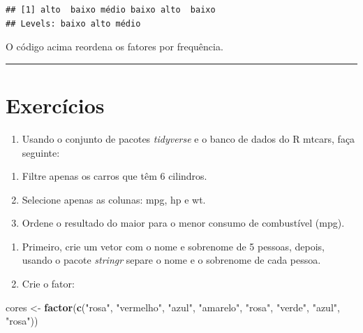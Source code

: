 \documentclass[
]{book}
\newenvironment{Shaded}{\begin{snugshade}}{\end{snugshade}}
\newcommand{\FunctionTok}[1]{\textcolor[rgb]{0.13,0.29,0.53}{\textbf{#1}}}
\newcommand{\NormalTok}[1]{#1}
\newcommand{\OtherTok}[1]{\textcolor[rgb]{0.56,0.35,0.01}{#1}}
\newcommand{\StringTok}[1]{\textcolor[rgb]{0.31,0.60,0.02}{#1}}
\providecommand{\tightlist}{%
  \setlength{\itemsep}{0pt}\setlength{\parskip}{0pt}}
\begin{document}
\begin{verbatim}
## [1] alto  baixo médio baixo alto  baixo
## Levels: baixo alto médio
\end{verbatim}

O código acima reordena os fatores por frequência.

\begin{center}\rule{0.5\linewidth}{0.5pt}\end{center}

\section{Exercícios}\label{exercuxedcios-1}

\begin{enumerate}
\def\labelenumi{\arabic{enumi}.}
\tightlist
\item
  Usando o conjunto de pacotes \emph{tidyverse} e o banco de dados do R mtcars, faça seguinte:
\end{enumerate}

\begin{enumerate}
\def\labelenumi{(\alph{enumi})}
\tightlist
\item
  Filtre apenas os carros que têm 6 cilindros.
\item
  Selecione apenas as colunas: mpg, hp e wt.
\item
  Ordene o resultado do maior para o menor consumo de combustível (mpg).
\end{enumerate}

\begin{enumerate}
\def\labelenumi{\arabic{enumi}.}
\setcounter{enumi}{1}
\item
  Primeiro, crie um vetor com o nome e sobrenome de 5 pessoas, depois, usando o pacote \emph{stringr} separe o nome e o sobrenome de cada pessoa.
\item
  Crie o fator:
\end{enumerate}

\begin{Shaded}
\begin{Highlighting}[]
\NormalTok{cores }\OtherTok{\textless{}{-}} \FunctionTok{factor}\NormalTok{(}\FunctionTok{c}\NormalTok{(}\StringTok{"rosa"}\NormalTok{, }\StringTok{"vermelho"}\NormalTok{, }\StringTok{"azul"}\NormalTok{, }\StringTok{"amarelo"}\NormalTok{, }\StringTok{"rosa"}\NormalTok{, }\StringTok{"verde"}\NormalTok{, }\StringTok{"azul"}\NormalTok{, }\StringTok{"rosa"}\NormalTok{))}
\end{Highlighting}
\end{Shaded}
\end{document}
